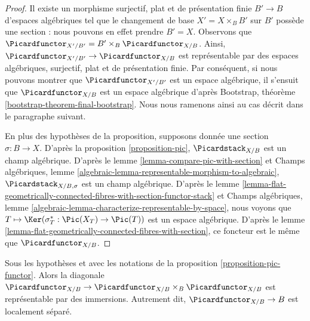 \begin{proof}
Il existe un morphisme surjectif, plat et de présentation finie
$B' \to B$ d'espaces algébriques tel que le changement de base
$X' = X \times_B B'$ sur $B'$ possède une section : nous pouvons en effet
prendre $B' = X$.
Observons que $\Picardfunctor_{X'/B'} = B' \times_B \Picardfunctor_{X/B}$.
Ainsi, $\Picardfunctor_{X'/B'} \to \Picardfunctor_{X/B}$ est représentable
par des espaces algébriques, surjectif, plat et de présentation finie.
Par conséquent, si nous pouvons montrer que $\Picardfunctor_{X'/B'}$ est un
espace algébrique, il s'ensuit que $\Picardfunctor_{X/B}$ est un espace
algébrique d'après Bootstrap, théorème
\ref{bootstrap-theorem-final-bootstrap}.
Nous nous ramenons ainsi au cas décrit dans le paragraphe suivant.

\medskip\noindent
En plus des hypothèses de la proposition, supposons donnée une section
$\sigma : B \to X$. D'après la proposition \ref{proposition-pic},
$\Picardstack_{X/B}$ est un champ algébrique.
D'après le lemme \ref{lemma-compare-pic-with-section} et
Champs algébriques, lemme
\ref{algebraic-lemma-representable-morphism-to-algebraic},
$\Picardstack_{X/B, \sigma}$ est un champ algébrique.
D'après le lemme
\ref{lemma-flat-geometrically-connected-fibres-with-section-functor-stack}
et Champs algébriques, lemme
\ref{algebraic-lemma-characterize-representable-by-space},
nous voyons que $T \mapsto \Ker(\sigma_T^* : \Pic(X_T) \to \Pic(T))$
est un espace algébrique.
D'après le lemme \ref{lemma-flat-geometrically-connected-fibres-with-section},
ce foncteur est le même que $\Picardfunctor_{X/B}$.
\end{proof}

\begin{lemma}
\label{lemma-diagonal-pic}
Sous les hypothèses et avec les notations de la proposition
\ref{proposition-pic-functor}.
Alors la diagonale
$\Picardfunctor_{X/B} \to \Picardfunctor_{X/B} \times_B \Picardfunctor_{X/B}$
est représentable par des immersions. Autrement dit,
$\Picardfunctor_{X/B} \to B$ est localement séparé.
\end{lemma}

